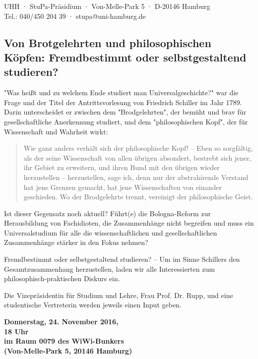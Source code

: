 \documentclass[a5paper,ngerman,headheight=80pt,10pt,DIV=calc]{scrartcl}
\begin{document}
    UHH · StuPa-Präsidium · Von-Melle-Park 5 · D-20146 Hamburg\\
    Tel.: 040/450 204 39 · stupa@uni-hamburg.de

    \subsection*{Von Brotgelehrten und philosophischen Köpfen: Fremdbestimmt oder
    selbstgestaltend studieren?}

    "Was heißt und zu welchem Ende studiert man Universalgeschichte?" war die
    Frage und der Titel der Antrittsvorlesung von Friedrich Schiller im Jahr 1789.
    Darin unterscheidet er zwischen dem "Brodgelehrten", der bemüht und brav für
    gesellschaftliche Anerkennung studiert, und dem "philosophischen Kopf", der
    für Wissenschaft und Wahrheit wirkt:

    \blockquote{
        Wie ganz anders verhält sich der
        philosophische Kopf! – Eben so sorgfältig, als der seine Wissenschaft von
        allen übrigen absondert, bestrebt sich jener, ihr Gebiet zu erweitern, und
        ihren Bund mit den übrigen wieder herzustellen – herzustellen, sage ich,
        denn nur der abstrahirende Verstand hat jene Grenzen gemacht, hat jene
        Wissenschaften von einander geschieden. Wo der Brodgelehrte trennt,
        vereinigt der philosophische Geist.
    }

    Ist dieser Gegensatz noch aktuell? Führt(e) die Bologna-Reform zur
    Herausbildung von Fachidioten, die Zusammenhänge nicht begreifen und muss
    ein Universalstudium für alle die wissenschaftlichen und gesellschaftlichen
    Zusammenhänge stärker in den Fokus nehmen?

    Fremdbestimmt oder selbstgestaltend studieren? – Um im Sinne Schillers den
    Gesamtzusammenhang herzustellen, laden wir alle Interessierten zum
    philosophisch-praktischen Diskurs ein.

    Die Vizepräsidentin für Studium und Lehre, Frau Prof. Dr. Rupp, und eine
    studentische Vertreterin werden jeweils einen Input geben.

    \begin{center}
        \textbf{
        Donnerstag, 24. November 2016,\\
        18 Uhr\\
        im Raum 0079 des WiWi-Bunkers\\
        (Von-Melle-Park 5, 20146 Hamburg)}
    \end{center}
\end{document}
